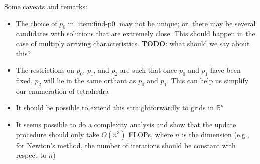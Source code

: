 \documentclass[eikonal.tex]{subfiles}
\begin{document}
\noindent Some caveats and remarks:
\begin{itemize}[nolistsep]
\item The choice of $p_0$ in \cref{item:find-p0} may not be unique;
  or, there may be several candidates with solutions that are
  extremely close. This should happen in the case of multiply arriving
  characteristics. \textbf{TODO}: what should we say about this?
\item The restrictions on $p_0$, $p_1$, and $p_2$ are such that once
  $p_0$ and $p_1$ have been fixed, $p_2$ will lie in the same orthant
  as $p_0$ and $p_1$. This can help us simplify our enumeration of
  tetrahedra
\item It should be possible to extend this straightforwardly to grids
  in $\mathbb{R}^n$
\item It seems possible to do a complexity analysis and show that the
  update procedure should only take $O(n^3)$ FLOPs, where $n$ is the
  dimension (e.g., for Newton's method, the number of iterations
  should be constant with respect to $n$)
\end{itemize}
\end{document}
